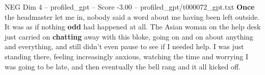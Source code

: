 \begin{textsample}{NEG Dim 4 – profiled\_gpt – Score -3.00 – profiled\_gpt/t000072\_gpt.txt}  \label{ex:f4_neg_002}
\textbf{Once} the headmaster let me in, nobody said a word about me having been left outside.
It was as if nothing \textbf{odd} had happened at all.
The Asian woman on the help desk just carried on \textbf{chatting} away with this bloke, going on and on about anything and everything, and still didn't even pause to see if I needed help.
I was just standing there, feeling increasingly anxious, watching the time and worrying I was going to be late, and then eventually the bell rang and it all kicked off.

\end{textsample}
